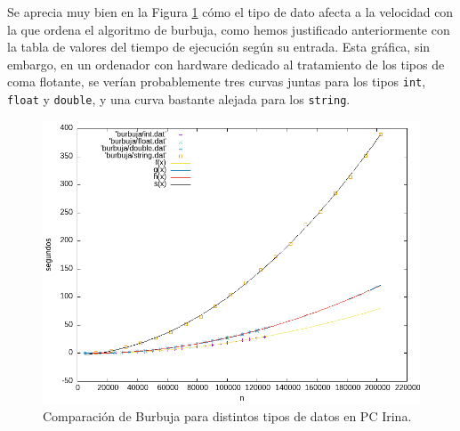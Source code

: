 \documentclass[12pt]{article}
\begin{document}
    Se aprecia muy bien en la Figura \ref{fig:Burbuja_Comparacion_graf} cómo el tipo de dato afecta a la velocidad con la que ordena el algoritmo de burbuja, como hemos justificado anteriormente con la tabla de valores del tiempo de ejecución según su entrada. Esta gráfica, sin embargo, en un ordenador con hardware dedicado al tratamiento de los tipos de coma flotante, se verían probablemente tres curvas juntas para los tipos \verb|int|, \verb|float| y \verb|double|, y una curva bastante alejada para los \verb|string|.
    \begin{figure}
        \centering
        \includegraphics[width=0.8\linewidth]{images/Burbuja/graficos/BurbujaCompTipos.png}
        \cprotect\caption{Comparación de Burbuja para distintos tipos de datos en PC Irina.}
        \label{fig:Burbuja_Comparacion_graf}
    \end{figure}
    
\end{document}
